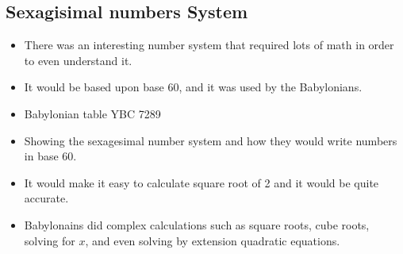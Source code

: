 \documentclass{article}
\begin{document}
\subsection{Sexagisimal numbers System}
\begin{itemize}
  \item There was an interesting number
    system that required lots of math in order
    to even understand it.
  \item It would be based upon base 60, and it was
    used by the Babylonians.
\end{itemize}

\begin{itemize}
  \item Babylonian table YBC 7289
  \item Showing the sexagesimal number system
    and how they would write numbers in base 60.
  \item It would make it easy to calculate square root of 2 and
    it would be quite accurate.
  \item Babylonains did complex calculations such as
    square roots, cube roots, solving for $x$, and even solving by extension quadratic equations.
\end{itemize}
\end{document}
